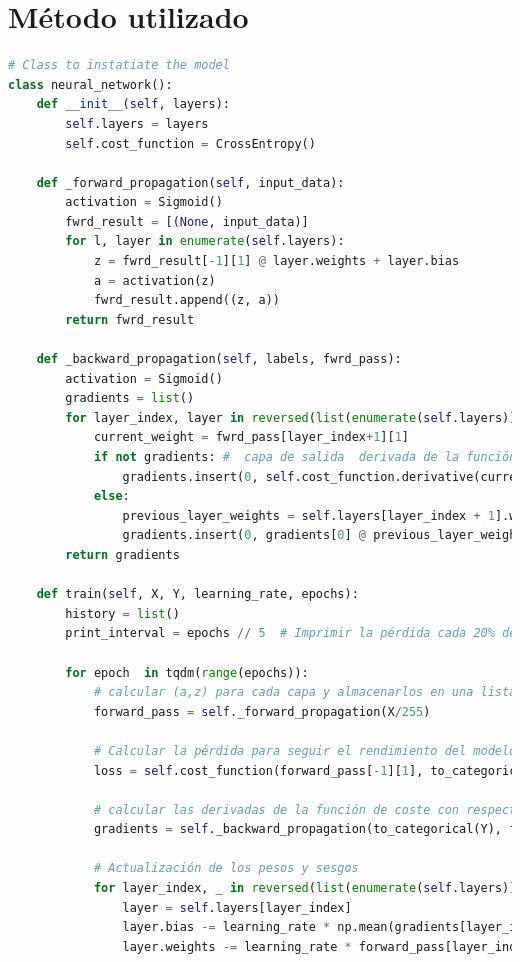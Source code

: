 \documentclass{article}
\begin{document}
    \section{Método utilizado}\label{sec:metodo-utilizado}
    \begin{lstlisting}[language=Python, caption={Red Neuronal Artificial}, label={lst:neural_network}]
# Class to instatiate the model
class neural_network():
    def __init__(self, layers):
        self.layers = layers
        self.cost_function = CrossEntropy()

    def _forward_propagation(self, input_data):
        activation = Sigmoid()
        fwrd_result = [(None, input_data)]
        for l, layer in enumerate(self.layers):
            z = fwrd_result[-1][1] @ layer.weights + layer.bias
            a = activation(z)
            fwrd_result.append((z, a))
        return fwrd_result

    def _backward_propagation(self, labels, fwrd_pass):
        activation = Sigmoid()
        gradients = list()
        for layer_index, layer in reversed(list(enumerate(self.layers))): # Iteramos las capas de atrás hacia adelante
            current_weight = fwrd_pass[layer_index+1][1]
            if not gradients: #  capa de salida  derivada de la función de coste
                gradients.insert(0, self.cost_function.derivative(current_weight, labels) * activation.derivative(current_weight))
            else:
                previous_layer_weights = self.layers[layer_index + 1].weights.T
                gradients.insert(0, gradients[0] @ previous_layer_weights * activation.derivative(current_weight))
        return gradients

    def train(self, X, Y, learning_rate, epochs):
        history = list()
        print_interval = epochs // 5  # Imprimir la pérdida cada 20% del entrenamiento

        for epoch  in tqdm(range(epochs)):
            # calcular (a,z) para cada capa y almacenarlos en una lista
            forward_pass = self._forward_propagation(X/255)

            # Calcular la pérdida para seguir el rendimiento del modelo durante el entrenamiento
            loss = self.cost_function(forward_pass[-1][1], to_categorical(Y))

            # calcular las derivadas de la función de coste con respecto a los pesos y sesgos (gradientes)
            gradients = self._backward_propagation(to_categorical(Y), forward_pass)

            # Actualización de los pesos y sesgos
            for layer_index, _ in reversed(list(enumerate(self.layers))):
                layer = self.layers[layer_index]
                layer.bias -= learning_rate * np.mean(gradients[layer_index], axis=0, keepdims=True)
                layer.weights -= learning_rate * forward_pass[layer_index][1].T @ gradients[layer_index]


\end{lstlisting}
\end{document}
